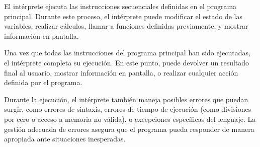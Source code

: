 El intérprete ejecuta las instrucciones secuenciales definidas en el programa principal. Durante este proceso, el intérprete puede modificar el estado de las variables, realizar cálculos, llamar a funciones definidas previamente, y mostrar información en pantalla.

Una vez que todas las instrucciones del programa principal han sido ejecutadas, el intérprete completa su ejecución. En este punto, puede devolver un resultado final al usuario, mostrar información en pantalla, o realizar cualquier acción definida por el programa.

Durante la ejecución, el intérprete también maneja posibles errores que puedan surgir, como errores de sintaxis, errores de tiempo de ejecución (como divisiones por cero o acceso a memoria no válida), o excepciones específicas del lenguaje. La gestión adecuada de errores asegura que el programa pueda responder de manera apropiada ante situaciones inesperadas.
